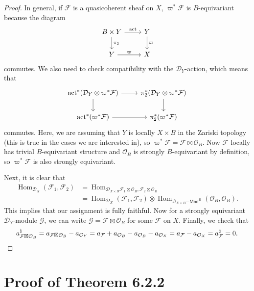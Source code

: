 \documentclass[leqno, openany]{memoir}
\theoremstyle{definition}
\theoremstyle{remark}
\theoremstyle{plain}
\theoremstyle{definition}
\theoremstyle{remark}
\newcommand{\mc}[1]{\mathcal{#1}}
\newcommand{\mr}[1]{\mathrm{#1}}
\newcommand{\ms}[1]{\mathsf{#1}}
\DeclareMathOperator{\Hom}{Hom}
\begin{document}
\begin{proof}
    In general, if $\mc{F}$ is a quasicoherent sheaf on $X$, $\varpi^* \mc{F}$ is $B$-equivariant because the diagram
    \begin{equation*}
    \begin{tikzcd}
        B \times Y \ar{d}{\pi_2} \ar{r}{\mr{act}} & Y \ar{d}{\varpi} \\
        Y \ar{r}{\varpi} & X
    \end{tikzcd}
    \end{equation*}
    commutes. We also need to check compatibility with the $\mc{D}_Y$-action, which means that
    \begin{equation*}
    \begin{tikzcd}
        \mr{act}^*(\mc{D}_Y \otimes \varpi^* \mc{F}) \ar{r} \ar{d} & \pi_2^* (\mc{D}_Y \otimes \varpi^* \mc{F}) \ar{d} \\
        \mr{act}^* (\varpi^* \mc{F}) \ar{r} & \pi_2^* (\varpi^* \mc{F})
    \end{tikzcd}
    \end{equation*}
    commutes. Here, we are assuming that $Y$ is locally $X \times B$ in the Zariski topology (this is true in the cases we are interested in), so $\varpi^* \mc{F} = \mc{F} \boxtimes \mc{O}_B$. Now $\mc{F}$ locally has trivial $B$-equivariant structure and $\mc{O}_B$ is strongly $B$-equivariant by definition, so $\varpi^* \mc{F}$ is also strongly equivariant.

    Next, it is clear that
    \begin{align*}
        \Hom_{\mc{D}_X}(\mc{F}_1, \mc{F}_2) &= \Hom_{\mc{D}_{X \times B} \mc{F}_1 \boxtimes \mc{O}_B, \mc{F}_2 \boxtimes \mc{O}_B} \\
        &= \Hom_{\mc{D}_X}(\mc{F}_1, \mc{F}_2) \otimes \Hom_{\mc{D}_{X \times B}\ms{-Mod}^B} (\mc{O}_B, \mc{O}_B).
    \end{align*}
    This implies that our assignment is fully faithful. Now for a strongly equivariant $\mc{D}_Y$-module $\mc{G}$, we can write $\mc{G} = \mc{F} \boxtimes \mc{O}_B$ for some $\mc{F}$ on $X$. Finally, we check that
    \[ a_{\mc{F} \boxtimes \mc{O}_B}^{\natural} = a_{\mc{F} \boxtimes \mc{O}_B} - a_{\mc{O}_Y} = a_{\mc{F}} + a_{\mc{O}_B} - a_{\mc{O}_B} - a_{\mc{O}_X} = a_{\mc{F}} - a_{\mc{O}_X} = a_{\mc{F}}^{\natural} = 0. \qedhere \]
\end{proof}

\section{Proof of Theorem 6.2.2}
\end{document}
